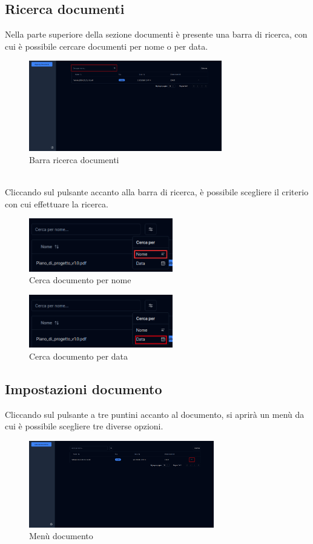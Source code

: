 \subsection{Ricerca documenti}
Nella parte superiore della sezione documenti è presente una barra di ricerca, con cui è possibile cercare documenti per nome o per data.
\begin{figure}[h!]
    \centering
    \includegraphics[width=0.75\textwidth]{schermatadocsearch.png}
    \caption{Barra ricerca documenti}\label{fig:searchdocs}
\end{figure}
\\Cliccando sul pulsante accanto alla barra di ricerca, è possibile scegliere il criterio con cui effettuare la ricerca.
\begin{figure}[h!]
    \centering
    \includegraphics[width=0.56\textwidth]{cercadocnome.png}
    \caption{Cerca documento per nome}\label{fig:searchdocsname}
\end{figure}
\begin{figure}[h!]
    \centering
    \includegraphics[width=0.56\textwidth]{cercadocdata.png}
    \caption{Cerca documento per data}\label{fig:searchdocsdate}
\end{figure}
\subsection{Impostazioni documento}
Cliccando sul pulsante a tre puntini accanto al documento, si aprirà un menù da cui è possibile scegliere tre diverse opzioni.
\begin{figure}[h!]
    \centering
    \includegraphics[width=0.72\textwidth]{schermatadoctrepunti.png}
    \caption{Menù documento}\label{fig:menudocs}
\end{figure}
